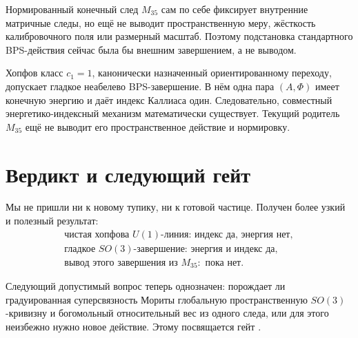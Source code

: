 Нормированный конечный след $M_{35}$ сам по себе фиксирует внутренние
матричные следы, но ещё не выводит пространственную меру, жёсткость
калибровочного поля или размерный масштаб. Поэтому подстановка стандартного
BPS-действия сейчас была бы внешним завершением, а не выводом.

\begin{theorem}
Хопфов класс $c_1=1$, канонически назначенный ориентированному переходу,
допускает гладкое неабелево BPS-завершение. В нём одна пара $(A,\Phi)$
имеет конечную энергию и даёт индекс Каллиаса один. Следовательно,
совместный энергетико-индексный механизм математически существует.
Текущий родитель $M_{35}$ ещё не выводит его пространственное действие и
нормировку.
\end{theorem}

\section{Вердикт и следующий гейт}

Мы не пришли ни к новому тупику, ни к готовой частице. Получен более узкий
и полезный результат:
\begin{equation}
 \boxed{
 \begin{gathered}
 \text{чистая хопфова }U(1)\text{-линия: индекс да, энергия нет},\\
 \text{гладкое }SO(3)\text{-завершение: энергия и индекс да},\\
 \text{вывод этого завершения из }M_{35}:\text{ пока нет}.
 \end{gathered}}
\end{equation}

Следующий допустимый вопрос теперь однозначен: порождает ли градуированная
суперсвязность Мориты глобальную пространственную $SO(3)$-кривизну и
богомольный относительный вес из одного следа, или для этого неизбежно
нужно новое действие. Этому посвящается гейт
.


